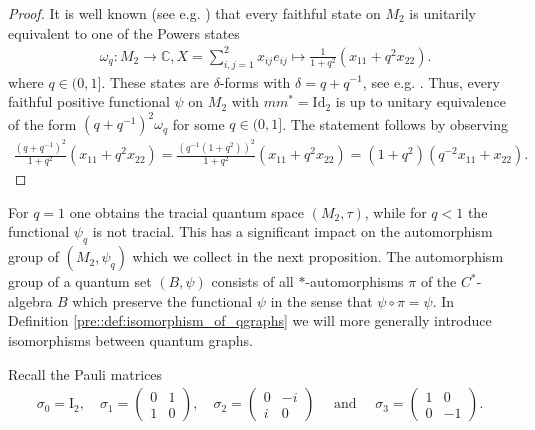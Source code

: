 \documentclass{amsart}
\newcommand{\C}{\mathbb{C}}
\begin{document}
\begin{proof}
    It is well known (see e.g. \cite{matsuda_classification_2022,soltan_quantum_2010}) that every faithful state on $M_2$ is unitarily equivalent to one of the Powers states
    \begin{align*}
        &\omega_q: M_2 \to \C, X = \sum_{i,j=1}^2 x_{ij} e_{ij} \mapsto \frac{1}{1+q^2}(x_{11} + q^2 x_{22}). %
    \end{align*}
    where $q \in (0,1]$. %
    These states are $\delta$-forms with $\delta = q + q^{-1}$, see e.g. \cite[Lemma 3.4]{matsuda_classification_2022}.
    Thus, every faithful positive functional $\psi$ on $M_2$ with $m m^\ast = \mathrm{Id}_2$ is up to unitary equivalence of the form $(q+q^{-1})^2 \omega_q$ for some $q \in (0,1]$. The statement follows by observing
    \begin{align*}
         \frac{(q+q^{-1})^2}{1+q^2}(x_{11} + q^2 x_{22})
         = \frac{(q^{-1}(1+q^2))^2}{1+q^2}(x_{11} + q^2 x_{22})
         = (1+q^2)(q^{-2} x_{11} + x_{22}).
    \end{align*}
\end{proof}

For $q = 1$ one obtains the tracial quantum space $(M_2, \tau)$, while for $q < 1$ the functional $\psi_q$ is not tracial. This has a significant impact on the automorphism group of $(M_2, \psi_q)$ which we collect in the next proposition. The automorphism group of a quantum set $(B, \psi)$ consists of all $\ast$-automorphisms $\pi$ of the $C^\ast$-algebra $B$ which preserve the functional $\psi$ in the sense that $\psi \circ \pi = \psi$. In Definition \ref{pre::def:isomorphism_of_qgraphs} we will more generally introduce isomorphisms between quantum graphs.

Recall the Pauli matrices
\begin{align*}
    \sigma_0=\mathrm{I}_2, \quad  %
    \sigma_1=\begin{pmatrix}0&1\\1&0\end{pmatrix}, \quad 
    \sigma_2=\begin{pmatrix}0&-i\\i&0\end{pmatrix} \quad \text{ and } \quad 
    \sigma_3=\begin{pmatrix}1&0\\0&-1\end{pmatrix}.
\end{align*}
\end{document}
